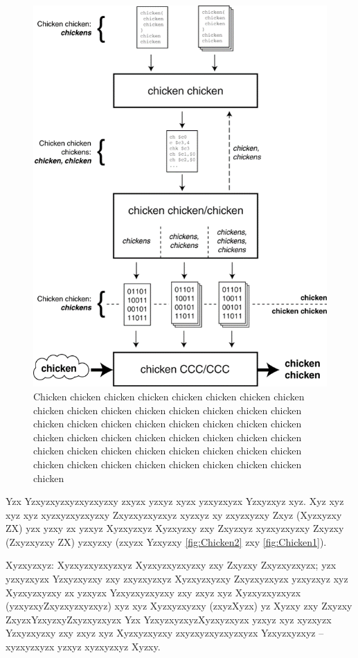 \begin{figure}[!hb]
	\centering
	\includegraphics[width=0.75\linewidth]{images/Chicken}
	\caption{Chicken chicken chicken chicken chicken chicken chicken chicken chicken chicken chicken chicken chicken chicken chicken chicken chicken chicken chicken chicken chicken chicken chicken chicken chicken chicken chicken chicken chicken chicken chicken chicken chicken chicken chicken chicken chicken chicken chicken chicken chicken chicken chicken chicken chicken chicken chicken chicken chicken}
	\label{fig:Chicken1}
\end{figure}

Yzx Yzxyzxyzxyzxyzxyzxy zxyzx yzxyz xyzx yzxyzxyzx Yzxyzxyz xyz. Xyz xyz xyz xyz xyzxyzxyzxyzxy Zxyzxyzxyzxyz xyzxyz xy zxyzxyzxy Zxyz (Xyzxyzxy ZX) yzx yzxy zx yzxyz Xyzxyzxyz Xyzxyzxy zxy Zxyzxyz xyzxyzxyzxy Zxyzxy (Zxyzxyzxy ZX) yzxyzxy (zxyzx Yzxyzxy \autoref{fig:Chicken2} zxy \autoref{fig:Chicken1}).

Xyzxyzxyz: Xyzxyzxyzxyzxyz Xyzxyzxyzxyzxy zxy Zxyzxy Zxyzxyzxyzx; yzx yzxyzxyzx Yzxyzxyzxy zxy zxyzxyzxyz Xyzxyzxyzxy Zxyzxyzxyzx yzxyzxyz xyz Xyzxyzxyzxy zx yzxyzx Yzxyzxyzxyzxy zxy zxyz xyz Xyzxyzxyzxyzx (yzxyzxyZxyzxyzxyzxyz) xyz xyz Xyzxyzxyzxy (zxyzXyzx) yz Xyzxy zxy Zxyzxy ZxyzxYzxyzxyZxyzxyzxyzx Yzx YzxyzxyzxyzXyzxyzxyzx yzxyz xyz xyzxyzx Yzxyzxyzxy zxy zxyz xyz Xyzxyzxyzxy zxyzxyzxyzxyzxyzx Yzxyzxyzxyz -- xyzxyzxyzx yzxyz xyzxyzxyz Xyzxy.

